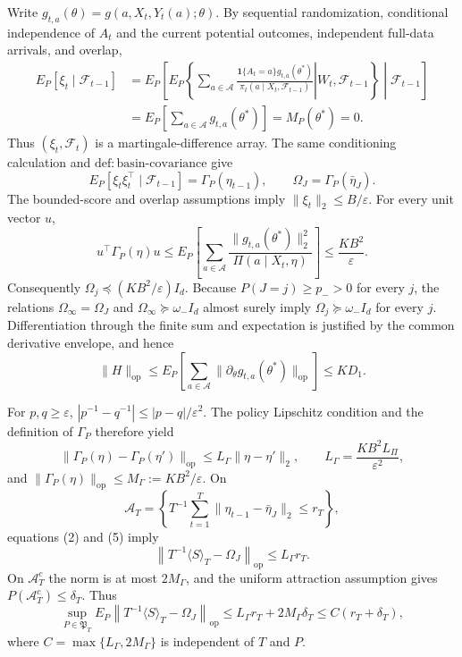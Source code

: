 Write \(g_{t,a}(\theta)=g(a,X_t,Y_t(a);\theta)\). By sequential randomization, conditional independence of \(A_t\) and the current potential outcomes, independent full-data arrivals, and overlap,
\[
\begin{aligned}
 E_P[\xi_t\mid\mathcal F_{t-1}]
 &=E_P\!\left[E_P\!\left\{\left.\sum_{a\in\mathcal A}
 \frac{\mathbf1\{A_t=a\}g_{t,a}(\theta^*)}
 {\pi_t(a\mid X_t,\mathcal F_{t-1})}\right|W_t,\mathcal F_{t-1}\right\}\middle|\mathcal F_{t-1}\right]\\
 &=E_P\!\left[\sum_{a\in\mathcal A}g_{t,a}(\theta^*)\right]
 =M_P(\theta^*)=0.
\end{aligned}
\tag{1}
\]
Thus \((\xi_t,\mathcal F_t)\) is a martingale-difference array. The same conditioning calculation and \(\mathrm{def:basin\text{-}covariance}\) give
\[
 E_P[\xi_t\xi_t^\top\mid\mathcal F_{t-1}]=\Gamma_P(\eta_{t-1}),
 \qquad \Omega_J=\Gamma_P(\bar\eta_J).
\tag{2}
\]
The bounded-score and overlap assumptions imply \(\|\xi_t\|_2\le B/\varepsilon\). For every unit vector \(u\),
\[
 u^\top\Gamma_P(\eta)u
 \le E_P\!\left[\sum_{a\in\mathcal A}
 \frac{\|g_{t,a}(\theta^*)\|_2^2}{\Pi(a\mid X_t,\eta)}\right]
 \le\frac{KB^2}{\varepsilon}.
\tag{3}
\]
Consequently \(\Omega_j\preceq(KB^2/\varepsilon)I_d\). Because \(P(J=j)\ge p_->0\) for every \(j\), the relations \(\Omega_\infty=\Omega_J\) and \(\Omega_\infty\succeq\omega_-I_d\) almost surely imply \(\Omega_j\succeq\omega_-I_d\) for every \(j\). Differentiation through the finite sum and expectation is justified by the common derivative envelope, and hence
\[
 \|H\|_{\mathrm{op}}
 \le E_P\!\left[\sum_{a\in\mathcal A}
 \|\partial_\theta g_{t,a}(\theta^*)\|_{\mathrm{op}}\right]
 \le KD_1.
\tag{4}
\]

For \(p,q\ge\varepsilon\), \(|p^{-1}-q^{-1}|\le|p-q|/\varepsilon^2\). The policy Lipschitz condition and the definition of \(\Gamma_P\) therefore yield
\[
 \|\Gamma_P(\eta)-\Gamma_P(\eta')\|_{\mathrm{op}}
 \le L_\Gamma\|\eta-\eta'\|_2,
 \qquad L_\Gamma=\frac{KB^2L_\Pi}{\varepsilon^2},
\tag{5}
\]
and \(\|\Gamma_P(\eta)\|_{\mathrm{op}}\le M_\Gamma:=KB^2/\varepsilon\). On
\[
 \mathcal A_T=\left\{T^{-1}\sum_{t=1}^T
 \|\eta_{t-1}-\bar\eta_J\|_2\le r_T\right\},
\]
equations (2) and (5) imply
\[
 \left\|T^{-1}\langle S\rangle_T-\Omega_J\right\|_{\mathrm{op}}
 \le L_\Gamma r_T.
\tag{6}
\]
On \(\mathcal A_T^c\) the norm is at most \(2M_\Gamma\), and the uniform attraction assumption gives \(P(\mathcal A_T^c)\le\delta_T\). Thus
\[
 \sup_{P\in\mathfrak P_T}E_P\left\|T^{-1}\langle S\rangle_T-\Omega_J\right\|_{\mathrm{op}}
 \le L_\Gamma r_T+2M_\Gamma\delta_T
 \le C(r_T+\delta_T),
\tag{7}
\]
where \(C=\max\{L_\Gamma,2M_\Gamma\}\) is independent of \(T\) and \(P\).

